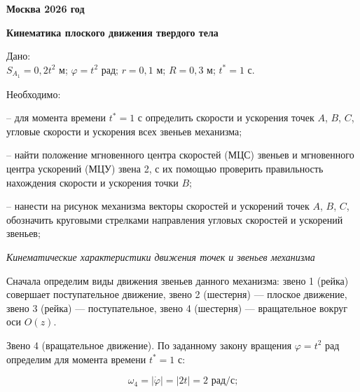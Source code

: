 \documentclass{article}
\begin{document}
\vfill
\textbf{Москва 2026 год}
\vspace{1cm}

\endgroup



\newpage

\begin{center}\large \textbf{Кинематика плоского движения твердого тела} \end{center}

\noindent Дано:\\ 
$S_{A_1} = 0,2t^2$ м; $\varphi = t^2$ рад; $r = 0,1$ м; $R = 0,3$ м; $t^* = 1$ с.

\medskip

\noindent Необходимо:

-- для момента времени $t^* = 1$ с определить скорости и ускорения точек $A$, $B$, $C$, угловые скорости и ускорения всех звеньев механизма;

-- найти положение мгновенного центра скоростей (МЦС) звеньев и мгновенного центра ускорений (МЦУ) звена 2, с их помощью проверить правильность нахождения скорости и ускорения точки $B$;

-- нанести на рисунок механизма векторы скоростей и ускорений точек $A$, $B$, $C$, обозначить круговыми стрелками направления угловых скоростей и ускорений звеньев;

\bigskip 
\bigskip 
\bigskip 
\bigskip 
\bigskip
\bigskip
\bigskip
\bigskip
\bigskip
\bigskip
\bigskip
\bigskip
\bigskip
\bigskip
\bigskip 
\bigskip 
\bigskip 
\bigskip 
\bigskip
\bigskip
\bigskip
\bigskip
\bigskip
\bigskip
\bigskip
\bigskip
\bigskip
\bigskip
\bigskip
\bigskip
\bigskip
\bigskip
\begin{center} \end{center}


\newpage

\textit{\textsf{Кинематические характеристики движения точек  
и звеньев механизма}}

\bigskip

Сначала определим виды движения звеньев данного механизма: звено 1 (рейка) совершает поступательное движение, звено 2 (шестерня) — плоское движение, звено 3 (рейка) — поступательное, звено 4 (шестерня) — вращательное вокруг оси $O(z)$.

\medskip

Звено 4 (вращательное движение). По заданному закону вращения $\varphi = t^2$ рад определим для момента времени $t^* = 1$ с:

\begin{equation}
\omega_4 = |\dot{\varphi}| = |2t| = 2 \text{ рад/с;}
\end{equation}
\end{document}
